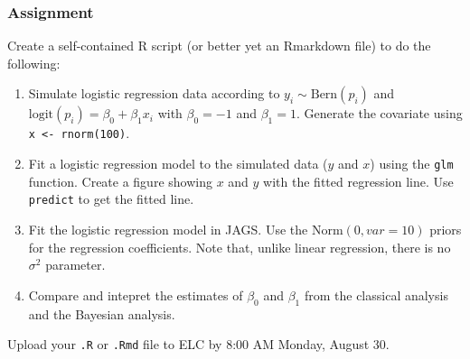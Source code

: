 \documentclass[color=usenames,dvipsnames]{beamer}\usepackage[]{graphicx}\usepackage[]{color}
\newcommand{\inr}[1]{\colorbox{inlinecolor}{\texttt{#1}}}
\begin{document}
\begin{frame}
  \frametitle{Assignment}
  \small
  Create a self-contained R script (or better yet an Rmarkdown file)
  to do the following:
  \begin{enumerate}
    \small
    \item Simulate logistic regression data according to
      $y_i \sim \mathrm{Bern}(p_i)$ and $\mathrm{logit}(p_i) = \beta_0
      + \beta_1 x_i$ with $\beta_0=-1$ and $\beta_1=1$. Generate the
      covariate using \inr{x <- rnorm(100)}.
    \item Fit a logistic regression model to the simulated data ($y$
      and $x$) using the \inr{glm} function. Create a figure showing
      $x$ and $y$ with the fitted regression line. Use
      \inr{predict} to get the fitted line.
    \item Fit the logistic regression model in JAGS. Use the
      $\mathrm{Norm}(0, var=10)$ priors for the regression
      coefficients. Note that, unlike linear regression, there is no
      $\sigma^2$ parameter.
    \item Compare and intepret the estimates of $\beta_0$ and
      $\beta_1$ from the classical analysis and the Bayesian analysis.
  \end{enumerate}
  Upload your {\tt .R} or {\tt .Rmd} file to ELC by 8:00 AM Monday,
  August 30. 
\end{frame}
\end{document}
